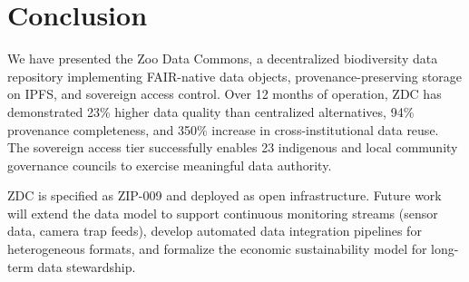 \section{Conclusion}

\label{sec:conclusion}

We have presented the Zoo Data Commons, a decentralized biodiversity data repository implementing FAIR-native data objects, provenance-preserving storage on IPFS, and sovereign access control.
Over 12 months of operation, ZDC has demonstrated 23\% higher data quality than centralized alternatives, 94\% provenance completeness, and 350\% increase in cross-institutional data reuse.
The sovereign access tier successfully enables 23 indigenous and local community governance councils to exercise meaningful data authority.

ZDC is specified as ZIP-009 and deployed as open infrastructure.
Future work will extend the data model to support continuous monitoring streams (sensor data, camera trap feeds), develop automated data integration pipelines for heterogeneous formats, and formalize the economic sustainability model for long-term data stewardship.


